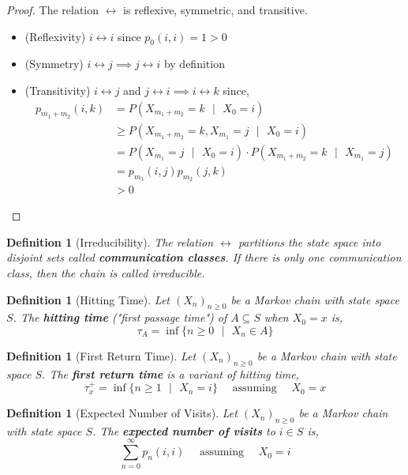 \documentclass{tufte-handout}
\newtheorem{defn}[thm]{Definition}
\begin{document}
  \begin{proof}
    The relation $\leftrightarrow$ is reflexive, symmetric, and transitive.
    \begin{itemize}
      \item (Reflexivity) $i \leftrightarrow i$ since $p_0(i,i) = 1 > 0$
      \item (Symmetry) $i \leftrightarrow j \implies j \leftrightarrow i$ by definition
      \item (Transitivity) $i \leftrightarrow j$ and $j \leftrightarrow i \implies i \leftrightarrow k$ since,
      \begin{align*}
        p_{m_1 + m_2}(i,k) &= P(X_{m_1 + m_2} = k \text{ $|$ } X_0 = i) \\
        &\geq P(X_{m_1 + m_2} = k, X_{m_1} = j \text{ $|$ } X_0 = i) \\
        &= P(X_{m_1} = j \text{ $|$ } X_0 = i) \cdot P(X_{m_1 + m_2} = k \text{ $|$ } X_{m_1} = j) \\
        &= p_{m_1}(i,j)p_{m_2}(j,k) \\
        &> 0
      \end{align*}
    \end{itemize}
  \end{proof}

  \begin{defn}[Irreducibility]
      The relation $\leftrightarrow$ partitions the state space into disjoint sets called \textbf{communication classes}. If there is only one communication class, then the chain is called irreducible.
  \end{defn}

  \begin{defn}[Hitting Time]
    Let $(X_n)_{n \geq 0}$ be a Markov chain with state space $S$. The \textbf{hitting time} ("first passage time") of $A \subseteq S$ when $X_0 = x$ is,
    \[\tau_A = \inf \{n \geq 0 \text{ $|$ } X_n \in A\}\]
  \end{defn}

  \begin{defn}[First Return Time]
    Let $(X_n)_{n \geq 0}$ be a Markov chain with state space $S$. The \textbf{first return time} is a variant of hitting time,
    \[\tau^+_x = \inf \{n \geq 1 \text{ $|$ } X_n = i\} \quad \text{ assuming } \quad \text{$X_0 = x$}\]
  \end{defn}

  \begin{defn}[Expected Number of Visits]
    Let $(X_n)_{n \geq 0}$ be a Markov chain with state space $S$. The \textbf{expected number of visits} to $i \in S$ is,
    \[\sum_{n=0}^\infty p_n(i,i) \quad \text{ assuming } \quad \text{$X_0 = i$}\]
  \end{defn}
\end{document}
